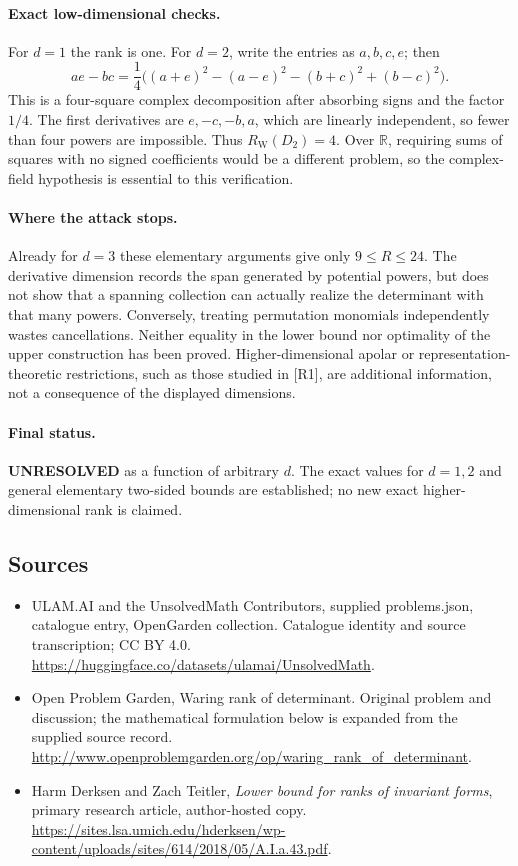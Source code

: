 \documentclass[11pt,a4paper]{article}
\begin{document}
\paragraph{Exact low-dimensional checks.}
For $d=1$ the rank is one. For $d=2$, write the entries as $a,b,c,e$;
then
\[
 ae-bc=\frac14\bigl((a+e)^2-(a-e)^2
                     -(b+c)^2+(b-c)^2\bigr).
\]
This is a four-square complex decomposition after absorbing signs and
the factor $1/4$. The first derivatives are $e,-c,-b,a$, which are
linearly independent, so fewer than four powers are impossible. Thus
$R_{\mathrm W}(D_2)=4$. Over $\mathbb R$, requiring sums of squares
with no signed coefficients would be a different problem, so the
complex-field hypothesis is essential to this verification.

\paragraph{Where the attack stops.}
Already for $d=3$ these elementary arguments give only $9\le R\le24$.
The derivative dimension records the span generated by potential powers,
but does not show that a spanning collection can actually realize the
determinant with that many powers. Conversely, treating permutation
monomials independently wastes cancellations. Neither equality in the
lower bound nor optimality of the upper construction has been proved.
Higher-dimensional apolar or representation-theoretic restrictions,
such as those studied in [R1], are additional information, not a
consequence of the displayed dimensions.

\paragraph{Final status.}
\textbf{UNRESOLVED} as a function of arbitrary $d$. The exact values
for $d=1,2$ and general elementary two-sided bounds are established;
no new exact higher-dimensional rank is claimed.

\subsection{Sources}
\begin{itemize}
\item[S1] ULAM.AI and the UnsolvedMath Contributors, supplied problems.json, catalogue entry, OpenGarden collection. Catalogue identity and source transcription; CC BY 4.0.
\url{https://huggingface.co/datasets/ulamai/UnsolvedMath}.
\item[S2] Open Problem Garden, Waring rank of determinant. Original problem and discussion; the mathematical formulation below is expanded from the supplied source record.
\url{http://www.openproblemgarden.org/op/waring_rank_of_determinant}.

\item[R1] Harm Derksen and Zach Teitler, \emph{Lower bound for ranks of
invariant forms}, primary research article, author-hosted copy.
\url{https://sites.lsa.umich.edu/hderksen/wp-content/uploads/sites/614/2018/05/A.I.a.43.pdf}.

\end{itemize}
\end{document}
